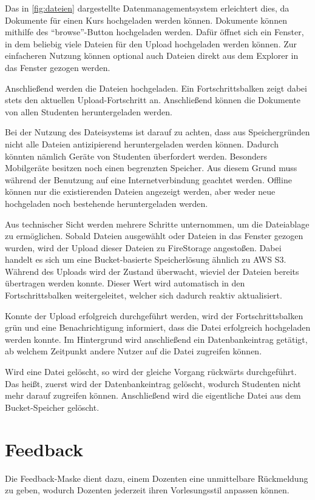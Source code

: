 Das in \autoref{fig:dateien} dargestellte Datenmanagementsystem erleichtert dies, da Dokumente für einen Kurs hochgeladen werden können.
Dokumente können mithilfe des \enquote{browse}-Button hochgeladen werden.
Dafür öffnet sich ein Fenster, in dem beliebig viele Dateien für den Upload hochgeladen werden können.
Zur einfacheren Nutzung können optional auch Dateien direkt aus dem Explorer in das Fenster gezogen werden.

Anschließend werden die Dateien hochgeladen.
Ein Fortschrittsbalken zeigt dabei stets den aktuellen Upload-Fortschritt an.
Anschließend können die Dokumente von allen Studenten heruntergeladen werden.

Bei der Nutzung des Dateisystems ist darauf zu achten, dass aus Speichergründen nicht alle Dateien antizipierend heruntergeladen werden können. Dadurch könnten nämlich Geräte von Studenten überfordert werden.
Besonders Mobilgeräte besitzen noch einen begrenzten Speicher.
Aus diesem Grund muss während der Benutzung auf eine Internetverbindung geachtet werden.
Offline können nur die existierenden Dateien angezeigt werden, aber weder neue hochgeladen noch bestehende heruntergeladen werden.


Aus technischer Sicht werden mehrere Schritte unternommen, um die Dateiablage zu ermöglichen.
Sobald Dateien ausgewählt oder Dateien in das Fenster gezogen wurden, wird der Upload dieser Dateien zu FireStorage angestoßen.
Dabei handelt es sich um eine Bucket-basierte Speicherlösung ähnlich zu AWS S3.
Während des Uploads wird der Zustand überwacht, wieviel der Dateien bereits übertragen werden konnte.
Dieser Wert wird automatisch in den Fortschrittsbalken weitergeleitet, welcher sich dadurch reaktiv aktualisiert.


Konnte der Upload erfolgreich durchgeführt werden, wird der Fortschrittsbalken grün und eine Benachrichtigung informiert, dass die Datei erfolgreich hochgeladen werden konnte.
Im Hintergrund wird anschließend ein Datenbankeintrag getätigt, ab welchem Zeitpunkt andere Nutzer auf die Datei zugreifen können.

Wird eine Datei gelöscht, so wird der gleiche Vorgang rückwärts durchgeführt.
Das heißt, zuerst wird der Datenbankeintrag gelöscht, wodurch Studenten nicht mehr darauf zugreifen können.
Anschließend wird die eigentliche Datei aus dem Bucket-Speicher gelöscht.


\section{Feedback}\label{sec:Feedback}
Die Feedback-Maske dient dazu, einem Dozenten eine unmittelbare Rückmeldung zu geben, wodurch Dozenten jederzeit ihren Vorlesungsstil anpassen können.


